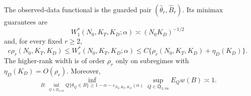 The observed-data functional is the guarded pair \((\widehat\theta_r,\widehat B_r)\). Its minimax guarantees are
\[
 W_1^*(N_0,K_T,K_D;\alpha)\asymp(N_0K_D)^{-1/2}
\]
and, for every fixed \(r\ge2\),
\[
 c\rho_r(N_0,K_T,K_D)\le W_r^*(N_0,K_T,K_D;\alpha)
 \le C\{\rho_r(N_0,K_T,K_D)+\eta_D(K_D)\}.
\]
The higher-rank width is of order \(\rho_r\) only on subregimes with \(\eta_D(K_D)=O(\rho_r)\). Moreover,
\[
 \inf_{B:\ \inf_{Q\in\mathfrak Q_{2,\mathrm{vis}}}Q\{\theta_Q\in B\}\ge1-\alpha-\varepsilon_{N_0,K_T,K_D}(\alpha)}
 \sup_{Q\in\mathfrak Q_{2,\mathrm{vis}}}E_Qw(B)\asymp1.
\]